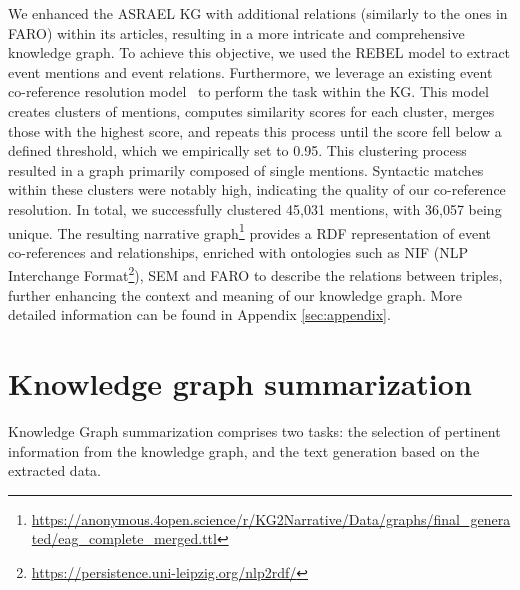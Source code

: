 \documentclass[
hf, %
]{ceurart}
\begin{document}
We enhanced the ASRAEL KG with additional relations (similarly to the ones in FARO) within its articles, resulting in a more intricate and comprehensive knowledge graph. To achieve this objective, we used the REBEL model \cite{REBEL} to extract event mentions and event relations. Furthermore, we leverage an existing event co-reference resolution model~\cite{barhom-etal-2019-revisiting} to perform the task within the KG. This model creates clusters of mentions, computes similarity scores for each cluster, merges those with the highest score, and repeats this process until the score fell below a defined threshold, which we empirically set to 0.95. This clustering process resulted in a graph primarily composed of single mentions. Syntactic matches within these clusters were notably high, indicating the quality of our co-reference resolution. In total, we successfully clustered 45,031 mentions, with 36,057 being unique. The resulting narrative graph\footnote{
\url{https://anonymous.4open.science/r/KG2Narrative/Data/graphs/final_generated/eag_complete_merged.ttl}
} provides a RDF representation of event co-references and relationships, enriched with ontologies such as NIF (NLP Interchange Format\footnote{\url{https://persistence.uni-leipzig.org/nlp2rdf/}}), SEM and FARO to describe the relations between triples, further enhancing the context and meaning of our knowledge graph. More detailed information can be found in Appendix \ref{sec:appendix}.

\section{Knowledge graph summarization}
\label{sec:KGS}
Knowledge Graph summarization comprises two tasks: the selection of pertinent information from the knowledge graph, and the text generation based on the extracted data.
\end{document}
